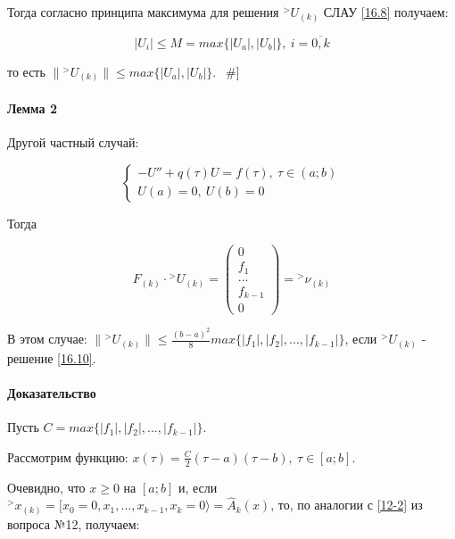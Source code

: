 \documentclass[__main__.tex]{subfiles}
\begin{document}
Тогда согласно принципа максимума для решения ${}^> U_{\left(k\right)}$ СЛАУ \ref{16.8} получаем:

$$
\left|U_i\right| \leq M = max \{ \left|U_a\right|, \left|U_b\right| \}, \ i = \overline{0,k}
$$

то есть $\| {}^> U_{\left(k\right)} \| \leq max \{ \left|U_a\right|, \left|U_b\right| \}$. $\ \ \# $]

\paragraph{Лемма 2}

Другой частный случай:

\begin{equation}\label{16.9}
\begin{cases}
-U''+q\left(\tau\right) U = f\left(\tau\right), \ \tau \in \left(a;b\right) \\
U\left(a\right) = 0, \ U\left(b\right) = 0
\end{cases}
\end{equation}

Тогда 

\begin{equation}\label{16.10}
F_{\left(k\right)} \cdot {}^>U_{\left(k\right)} = \left(
\begin{matrix}
0 \\ f_1 \\ ... \\ f_{k-1} \\ 0
\end{matrix}
\right) = {}^>\nu_{\left(k\right)}
\end{equation}

В этом случае: $\| {}^> U_{\left(k\right)} \| \leq \frac{\left(b-a\right)^2}{8} max \{ \left|f_1\right|, \left|f_2\right|, ..., \left|f_{k-1}\right| \}$, если ${}^>U_{\left(k\right)}$ - решение \ref{16.10}.

\paragraph{Доказательство}

Пусть $C = max \{\left|f_1\right|,\left|f_2\right|,...,\left|f_{k-1}\right|\}$.

Рассмотрим функцию: $x\left(\tau\right) = \frac{C}{2} \left(\tau - a\right) \left(\tau - b\right), \ \tau \in [a;b]$.

Очевидно, что $x\geq 0$ на $[a;b]$ и, если ${}^> x_{\left(k\right)} = [ x_0 = 0, x_1, ..., x_{k-1}, x_k = 0 \rangle = \hat{A}_k \left(x\right)$, то, по аналогии с \ref{12-2} из вопроса №12, получаем:
\end{document}
